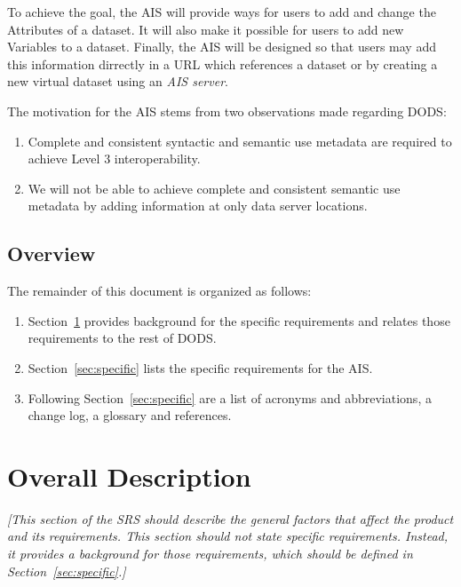 \documentclass{article}
\begin{document}
To achieve the goal, the \ac{AIS} will provide ways for users to add and
change the Attributes of a dataset. It will also make it possible for users
to add new Variables to a dataset. Finally, the \ac{AIS} will be designed so
that users may add this information dirrectly in a URL which references a
dataset or by creating a new virtual dataset using an \emph{\ac{AIS} server}.

The motivation for the \ac{AIS} stems from two observations made
regarding \ac{DODS}:
\begin{enumerate}
\item Complete and consistent syntactic and semantic use 
   metadata are required to achieve Level 3 interoperability.

\item We will not be able to achieve complete and consistent
   semantic use metadata by adding information at only data server locations.
\end{enumerate}

\subsection{Overview}

The remainder of this document is organized as follows:
\begin{enumerate}
\item Section~\ref{sec:overall} provides background for the specific
  requirements and relates those requirements to the rest of DODS.
\item Section~\ref{sec:specific} lists the specific requirements for the
  \ac{AIS}.
\item Following Section~\ref{sec:specific} are a list of acronyms and
  abbreviations, a change log, a glossary and references.
\end{enumerate}


\section{Overall Description}
\label{sec:overall}

\emph{[This section of the SRS should describe the general factors that
  affect the product and its requirements. This section should not state
  specific requirements. Instead, it provides a background for those
  requirements, which should be defined in Section~\ref{sec:specific}.]}
\end{document}
